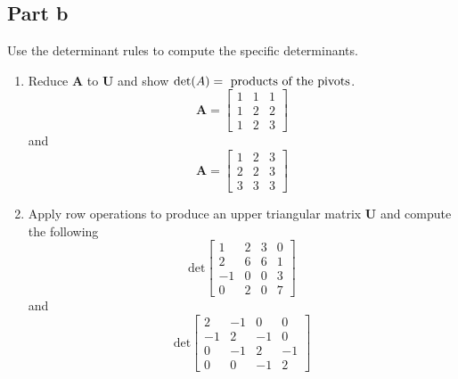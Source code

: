 \subsection{Part b}
Use the determinant rules to compute the specific determinants.
\begin{enumerate}[label=\arabic*.]
    \item Reduce $\mathbf{A}$ to $\mathbf{U}$ and show $\text{det}(A) = \text{
            products of the pivots}$.
        \begin{equation}
            \mathbf{A} = 
            \begin{bmatrix}
                1       &       1       &       1   \\
                1       &       2       &       2   \\
                1       &       2       &       3
            \end{bmatrix}
        \end{equation}
        and
        \begin{equation}
            \mathbf{A} =
            \begin{bmatrix}
                1       &       2       &       3   \\
                2       &       2       &       3   \\
                3       &       3       &       3
            \end{bmatrix}
        \end{equation}

    \item Apply row operations to produce an upper triangular matrix
        $\mathbf{U}$ and compute the following
        \begin{equation}
            \text{det}
            \begin{bmatrix}
                1   &   2   &   3   &   0   \\
                2   &   6   &   6   &   1   \\
                -1  &   0   &   0   &   3   \\
                0   &   2   &   0   &   7
            \end{bmatrix}
        \end{equation}
        and
        \begin{equation}
            \text{det}
            \begin{bmatrix}
                2   &   -1  &   0   &   0   \\
                -1  &   2   &   -1  &   0   \\
                0   &   -1  &   2   &   -1  \\
                0   &   0   &   -1  &   2
            \end{bmatrix}
        \end{equation}


\end{enumerate}
